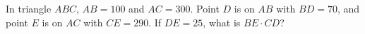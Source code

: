 In triangle $ABC$, $AB=100$ and $AC=300$. Point $D$ is on $AB$ with $BD=70$, and point $E$ is on $AC$ with $CE=290$. If $DE=25$, what is $BE\cdot CD$?
